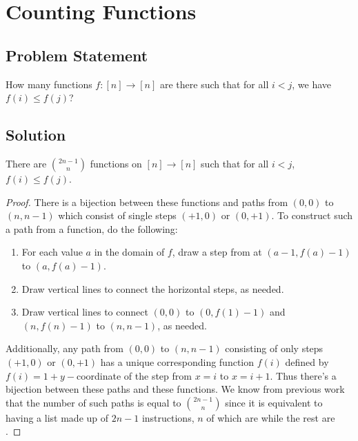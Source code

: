 \documentclass[12pt]{article}
\newcommand{\ProblemStatement}[1]{
\subsection*{Problem Statement}
#1
\subsection*{Solution}
}
\begin{document}
\section{Counting Functions}
\ProblemStatement{
How many functions $f : [n] \rightarrow [n]$ are there such that for all $i < j$, we have $f(i) \leq f(j)$?
}

There are $\binom{2n-1}{n}$ functions on $[n] \rightarrow [n]$ such that for all $i < j$, $f(i) \leq f(j)$. 

\begin{proof}
There is a bijection between these functions and paths from $(0, 0)$ to ${(n, n-1)}$ which consist of single steps $(+1, 0)$ or $(0, +1)$. To construct such a path from a function, do the following:
\begin{enumerate}
    \item For each value $a$ in the domain of $f$, draw a step from at $(a-1, f(a)-1)$ to $(a, f(a)-1)$. 
    \item Draw vertical lines to connect the horizontal steps, as needed.
    \item Draw vertical lines to connect $(0,0)$ to $(0, f(1)-1)$ and $(n, f(n)-1)$ to $(n,n-1)$, as needed.
\end{enumerate}

Additionally, any path from $(0,0)$ to $(n,n-1)$ consisting of only steps $(+1, 0)$ or $(0, +1)$ has a unique corresponding function $f(i)$ defined by $f(i) = 1 + y-$coordinate of the step from $x=i$ to $x=i+1$. Thus there's a bijection between these paths and these functions. We know from previous work that the number of such paths is equal to $\binom{2n-1}{n}$ since it is equivalent to having a list made up of $2n-1$ instructions, $n$ of which are  while the rest are .
\end{proof}
\newcommand{\bijectpath}[3]{\scalebox{.8}{
\begin{tikzpicture}
\draw[step=1.0,black,thin,color=black,opacity=.35] (0,0) grid (3,2);
\draw [-,line width=1pt] (0,0) -- (0,#1-1) --
    (1, #1-1) node[shape=circle,fill=black,minimum width=.2cm,inner sep=0pt] {} -- 
    (1, #2-1) --
    (2, #2-1) node[shape=circle,fill=black,minimum width=.2cm,inner sep=0pt] {} -- 
    (2, #3-1) --
    (3, #3-1)node[shape=circle,fill=black,minimum width=.2cm,inner sep=0pt] {} -- 
    (3, 2);
\node [above] at (5.85,-.5) {\parbox{3em}{
    \begin{align*}
    \iff f(x) = 
    \begin{cases}
    #1&: x=1\\
    #2&: x=2\\
    #3&: x=3\\
\end{cases}
    \end{align*}
}};
\end{tikzpicture}
}
}
\end{document}
